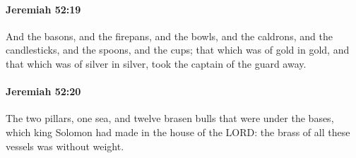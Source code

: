 		\paragraph{Jeremiah 52:19} %
			\label{JEREMIAH-52-19}

			And the basons, and the firepans, and the bowls, and the caldrons, and the candlesticks, and the spoons, and the cups; that which was of gold in gold, and that which was of silver in silver, took the captain of the guard away.


		\paragraph{Jeremiah 52:20} %
			\label{JEREMIAH-52-20}

			The two pillars, one sea, and twelve brasen bulls that were under the bases, which king Solomon had made in the house of the LORD: the brass of all these vessels was without weight.

